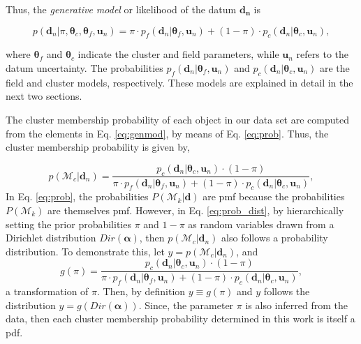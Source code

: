 Thus, the \emph{generative model} or likelihood of the datum $\mathbf{d_n}$  is

\begin{equation}
\label{eq:genmod}
p(\mathbf{d}_n | \pi,\boldsymbol{\theta}_c,\boldsymbol{\theta}_f,\mathbf{u}_n)=\pi \cdot p_f(\mathbf{d}_n|\boldsymbol{\theta}_f,\mathbf{u}_n) + (1-\pi)\cdot p_c(\mathbf{d}_n| \boldsymbol{\theta}_c,\mathbf{u}_n),
\end{equation}

where $\boldsymbol{\theta}_f$ and $\boldsymbol{\theta}_c$ indicate the cluster and field parameters, while $\mathbf{u}_n$ refers to the datum uncertainty. The probabilities $p_f(\mathbf{d}_n|\boldsymbol{\theta}_f,\mathbf{u}_n)$ and $p_c(\mathbf{d}_n| \boldsymbol{\theta}_c,\mathbf{u}_n)$ are the field and cluster models, respectively. These models are explained in detail in the next two sections.

The cluster membership probability of each object in our data set are computed from the elements in Eq. \ref{eq:genmod}, by means of Eq. \ref{eq:prob}. Thus, the cluster membership probability is given by,

\begin{equation}
\label{eq:prob_dist}
p( \mathcal{M}_c | \mathbf{d}_n) =\frac{p_c(\mathbf{d}_n| \boldsymbol{\theta}_c,\mathbf{u}_n)\cdot (1-\pi)}{\pi \cdot p_f(\mathbf{d}_n|\boldsymbol{\theta}_f,\mathbf{u}_n) + (1-\pi)\cdot p_c(\mathbf{d}_n| \boldsymbol{\theta}_c,\mathbf{u}_n)},
\end{equation}
In Eq. \ref{eq:prob}, the probabilities $P( \mathcal{M}_k | \mathbf{d})$ are \gls{pmf} because the probabilities $P( \mathcal{M}_k )$ are themselves \gls{pmf}. However, in Eq. \ref{eq:prob_dist}, by hierarchically setting the prior probabilities $\pi$ and $1-\pi$ as random variables drawn from a Dirichlet distribution $Dir(\boldsymbol{\alpha})$, then $p(\mathcal{M}_c | \mathbf{d}_n)$ also follows a probability distribution. To demonstrate this, let  $y= p( \mathcal{M}_c | \mathbf{d}_n)$, and 
\begin{equation}
g(\pi)= \frac{p_c(\mathbf{d}_n| \boldsymbol{\theta}_c,\mathbf{u}_n)\cdot (1-\pi)}{\pi \cdot p_f(\mathbf{d}_n|\boldsymbol{\theta}_f,\mathbf{u}_n) + (1-\pi)\cdot p_c(\mathbf{d}_n| \boldsymbol{\theta}_c,\mathbf{u}_n)},\nonumber
\end{equation}
a transformation of $\pi$. Then, by definition $y \equiv g(\pi)$ and $y$ follows the distribution $y= g(Dir(\boldsymbol{\alpha}))$. Since, the parameter $\pi$ is also inferred from the data, then each cluster membership probability determined in this work is itself a \gls{pdf}. 



